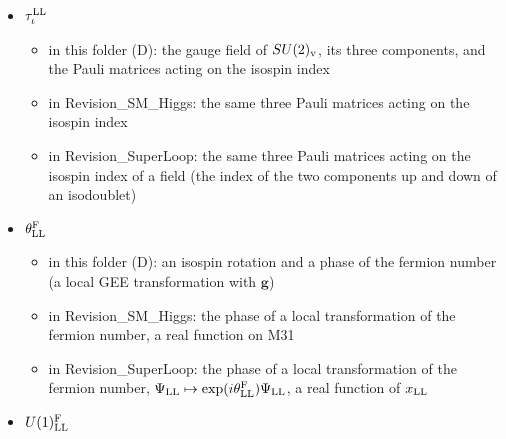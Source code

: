 \documentclass[
  10pt,
]{article}
\providecommand{\tightlist}{%
  \setlength{\itemsep}{0pt}\setlength{\parskip}{0pt}}
\begin{document}
\begin{itemize}
  \begin{itemize}
  \tightlist
  \item
    in this folder (B.7, D): the isospin generators
    \(\mathsf 1_4\otimes\tau^{\rm LL}_\iota/2\) and the Levi-Civita
    symbol of three indices
  \item
    in Revision\_SM\_Higgs: the generators of \(SU(2)_{\rm v}\) on the
    spinor field, \(\mathsf 1_4\otimes\tau^{\rm LL}_\iota/2\);
    \([T^1_{\rm LL},T^2_{\rm LL}]=iT^3_{\rm LL}\) and cyclically
  \item
    in Revision\_SuperLoop: the isospin generators
    \(T^\iota_{\rm LL}=i\,D^{\rm v}_{\rm LL}(\mathbf e_\iota/2)\),
    Hermitian, \([T^1_{\rm LL},T^2_{\rm LL}]=iT^3_{\rm LL}\) and
    cyclically, and the isospin Casimir
    \((T_{\rm LL})^2=\sum_\iota(T^\iota_{\rm LL})^2\)
  \end{itemize}
\item
  \(\tau^{\rm LL}_\iota\)

  \begin{itemize}
  \tightlist
  \item
    in this folder (D): the gauge field of \(SU(2)_{\rm v}\), its three
    components, and the Pauli matrices acting on the isospin index
  \item
    in Revision\_SM\_Higgs: the same three Pauli matrices acting on the
    isospin index
  \item
    in Revision\_SuperLoop: the same three Pauli matrices acting on the
    isospin index of a field (the index of the two components up and
    down of an isodoublet)
  \end{itemize}
\item
  \(\theta^{\rm F}_{\rm LL}\)

  \begin{itemize}
  \tightlist
  \item
    in this folder (D): an isospin rotation and a phase of the fermion
    number (a local GEE transformation with \(\mathbf g\))
  \item
    in Revision\_SM\_Higgs: the phase of a local transformation of the
    fermion number, a real function on M31
  \item
    in Revision\_SuperLoop: the phase of a local transformation of the
    fermion number,
    \(\Psi_{\rm LL}\mapsto\exp(i\theta^{\rm F}_{\rm LL})\Psi_{\rm LL}\),
    a real function of \(x_{\rm LL}\)
  \end{itemize}
\item
  \(U(1)^{\rm F}_{\rm LL}\)


\end{itemize}
\end{document}
